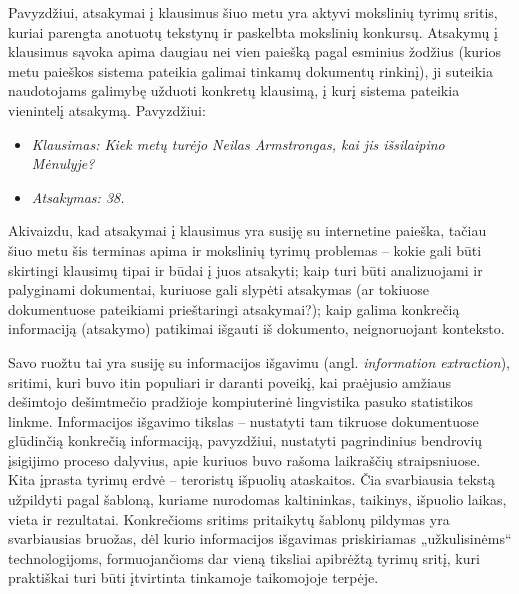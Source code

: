\begin{multicols}{2}

Pavyzdžiui, atsakymai į klausimus šiuo metu yra aktyvi mokslinių tyrimų sritis, kuriai parengta anotuotų tekstynų ir paskelbta mokslinių konkursų. Atsakymų į klausimus sąvoka apima daugiau nei vien paiešką pagal esminius žodžius (kurios metu paieškos sistema pateikia galimai tinkamų dokumentų rinkinį), ji suteikia naudotojams galimybę užduoti konkretų klausimą, į kurį sistema pateikia vienintelį atsakymą. Pavyzdžiui:

\begin{itemize}
\item[] \textit{Klausimas: Kiek metų turėjo Neilas Armstrongas, kai jis išsilaipino Mėnulyje?}
\item[] \textit{Atsakymas: 38.}
\end{itemize}

Akivaizdu, kad atsakymai į klausimus yra susiję su internetine paieška, tačiau šiuo metu šis terminas apima ir mokslinių tyrimų problemas – kokie gali būti skirtingi klausimų tipai ir būdai į juos atsakyti; kaip turi būti analizuojami ir palyginami dokumentai, kuriuose gali slypėti atsakymas (ar tokiuose dokumentuose pateikiami prieštaringi atsakymai?); kaip galima konkrečią informaciją (atsakymo) patikimai išgauti iš dokumento, neignoruojant konteksto.    

Savo ruožtu tai yra susiję su informacijos išgavimu (angl. \textit{information extraction}), sritimi, kuri buvo itin populiari ir daranti poveikį, kai praėjusio amžiaus dešimtojo dešimtmečio pradžioje kompiuterinė lingvistika pasuko statistikos linkme. Informacijos išgavimo tikslas – nustatyti tam tikruose dokumentuose glūdinčią konkrečią informaciją, pavyzdžiui, nustatyti pagrindinius bendrovių įsigijimo proceso dalyvius, apie kuriuos buvo rašoma laikraščių straipsniuose. Kita įprasta tyrimų erdvė – teroristų išpuolių ataskaitos. Čia svarbiausia tekstą užpildyti pagal šabloną, kuriame nurodomas kaltininkas, taikinys, išpuolio laikas, vieta ir rezultatai. Konkrečioms sritims pritaikytų šablonų pildymas yra svarbiausias bruožas, dėl kurio informacijos išgavimas priskiriamas „užkulisinėms“ technologijoms, formuojančioms dar vieną tiksliai apibrėžtą tyrimų sritį, kuri praktiškai turi būti įtvirtinta tinkamoje taikomojoje terpėje.    


\end{multicols}
